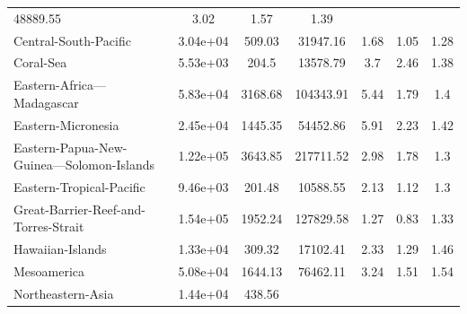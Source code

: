 \begin{table}[H]
{\begin{tabular}{lcccccc}
            48889.55                                   &
            3.02                                       & 1.57     & 1.39
            \\
            Central-South-Pacific                      & 3.04e+04 & 509.03  &
            31947.16                                   &
            1.68                                       & 1.05     & 1.28
            \\
            Coral-Sea                                  & 5.53e+03 & 204.5   &
            13578.79                                   &
            3.7                                        & 2.46     & 1.38
            \\
            Eastern-Africa---Madagascar                & 5.83e+04 & 3168.68 &
            104343.91                                  &
            5.44                                       & 1.79     & 1.4
            \\
            Eastern-Micronesia                         & 2.45e+04 & 1445.35 &
            54452.86                                   &
            5.91                                       & 2.23     & 1.42
            \\
            Eastern-Papua-New-Guinea---Solomon-Islands & 1.22e+05 & 3643.85 &
            217711.52                                  &
            2.98                                       & 1.78     & 1.3
            \\
            Eastern-Tropical-Pacific                   & 9.46e+03 & 201.48  &
            10588.55                                   &
            2.13                                       & 1.12     & 1.3
            \\
            Great-Barrier-Reef-and-Torres-Strait       & 1.54e+05 & 1952.24 &
            127829.58                                  &
            1.27                                       & 0.83     & 1.33
            \\
            Hawaiian-Islands                           & 1.33e+04 & 309.32  &
            17102.41                                   &
            2.33                                       & 1.29     & 1.46
            \\
            Mesoamerica                                & 5.08e+04 & 1644.13 &
            76462.11                                   &
            3.24                                       & 1.51     & 1.54
            \\
            Northeastern-Asia                          & 1.44e+04 & 438.56  &

\end{tabular}}
\end{table}
